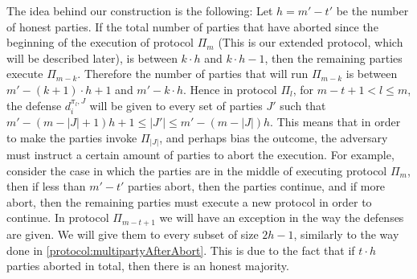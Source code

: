 The idea behind our construction is the following: Let $h=m'-t'$ be the number of honest parties. If the total number of parties that have aborted since the beginning of the execution of protocol $\Pi_m$ (This is our extended protocol, which will be described later), is between $k\cdot h$ and $k\cdot h-1$, then the remaining parties execute $\Pi_{m-k}$. Therefore the number of parties that will run $\Pi_{m-k}$ is between $m'-(k+1)\cdot h+1$ and $m'-k\cdot h$. Hence in protocol $\Pi_l$, for $m-t+1<l\leq m$, the defense $d_i^{\pi_{l},J}$ will be given  to every set of parties $J'$ such that $m'-(m-|J|+1)h+1\leq|J'|\leq m'-(m-|J|)h$. This means that in order to make the parties invoke $\Pi_{|J|}$, and perhaps bias the outcome, the adversary must instruct a certain amount of parties to abort the execution. For example, consider the case in which the parties are in the middle of executing protocol $\Pi_m$, then if less than $m'-t'$ parties abort, then the parties continue, and if more abort, then the remaining parties must execute a new protocol in order to continue. In protocol $\Pi_{m-t+1}$ we will have an exception in the way the defenses are given. We will give them to every subset of size $2h-1$, similarly to the way done in \cref{protocol:multipartyAfterAbort}. This is due to the fact that if $t\cdot h$ parties aborted in total, then there is an honest majority.


